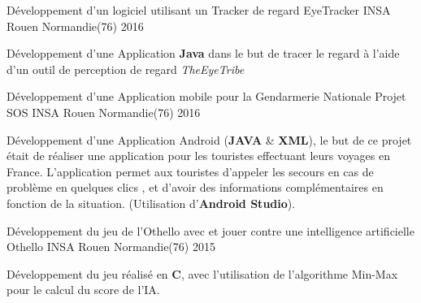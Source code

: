 

\begin{cventries}

  \cventry
	{Développement d'un logiciel utilisant un Tracker de regard} %
	{EyeTracker} %
	{INSA Rouen Normandie(76)} %
	{2016} %
	{
		\begin{cvitems} %
			\item {Développement d'une Application \textbf{Java} dans le but de tracer le regard à l'aide d'un outil de perception de regard \textit{TheEyeTribe}}
		\end{cvitems}
	}

  \cventry
	{Développement d'une Application mobile pour la Gendarmerie Nationale} %
	{Projet SOS} %
	{INSA Rouen Normandie(76)} %
	{2016} %
	{
		\begin{cvitems} %
			\item {Développement d'une Application Android (\textbf{JAVA} \& \textbf{XML}), le but de ce projet était de réaliser une application pour les touristes effectuant leurs voyages en France. L'application permet aux touristes d'appeler les secours en cas de problème en quelques clics , et d'avoir des informations complémentaires en fonction de la situation. (Utilisation d'\textbf{Android Studio}). }
		\end{cvitems}
	}

  \cventry
	{Développement du jeu de l'Othello avec et jouer contre une intelligence artificielle} %
	{Othello} %
	{INSA Rouen Normandie(76)} %
	{2015} %
	{
		\begin{cvitems} %
			\item {Développement du jeu réalisé en \textbf{C}, avec l'utilisation de l'algorithme Min-Max pour le calcul du score de l'IA.}
		\end{cvitems}
	}


\end{cventries}
